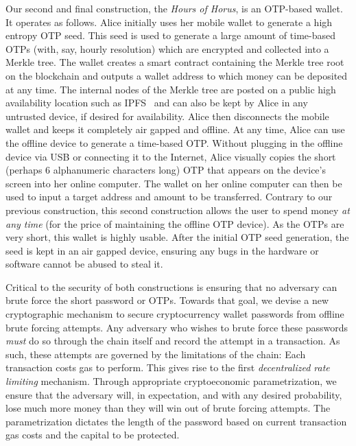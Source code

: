 Our second and final construction, the \emph{Hours of Horus},
is an OTP-based wallet. It operates as follows.
Alice initially uses her mobile wallet to generate a high entropy OTP seed.
This seed is used to generate
a large amount of time-based OTPs (with, say, hourly resolution) which are encrypted
and collected into a Merkle tree. The wallet creates a smart contract containing the
Merkle tree root on the blockchain and outputs a wallet address to which money can
be deposited at any time. The internal nodes of the Merkle tree are posted on a public
high availability location such as IPFS~\cite{ipfs} and can also be kept by Alice
in any untrusted device, if desired for availability. Alice then disconnects the mobile wallet and keeps it
completely air gapped and offline. At any time, Alice can use the offline device to generate
a time-based OTP. Without plugging in the offline device via USB or connecting it
to the Internet, Alice visually copies the short (perhaps $6$ alphanumeric characters long)
OTP that appears on the device's screen into her online computer. The wallet on
her online computer can then be used to input a target address and amount to be transferred.
Contrary to our previous construction, this second construction allows the user
to spend money \emph{at any time} (for the price of maintaining
the offline OTP device). As the OTPs are very short, this wallet is highly usable.
After the initial OTP seed generation, the seed is kept in an
air gapped device, ensuring any bugs in the hardware or software cannot be abused
to steal it.

Critical to the security of both constructions is ensuring that no adversary can
brute force the short password or OTPs.
Towards that goal, we devise a new cryptographic mechanism to secure cryptocurrency
wallet passwords from offline brute forcing attempts. Any adversary who wishes
to brute force these passwords \emph{must} do so through the chain itself and
record the attempt in a transaction. As such, these attempts are governed by
the limitations of the chain: Each transaction costs gas to perform. This
gives rise to the first \emph{decentralized rate limiting} mechanism. Through
appropriate cryptoeconomic parametrization, we ensure that the adversary will,
in expectation, and with any desired probability, lose much more money than they
will win out of brute forcing attempts. The parametrization dictates the length
of the password based on current transaction gas costs and the capital to be
protected.

